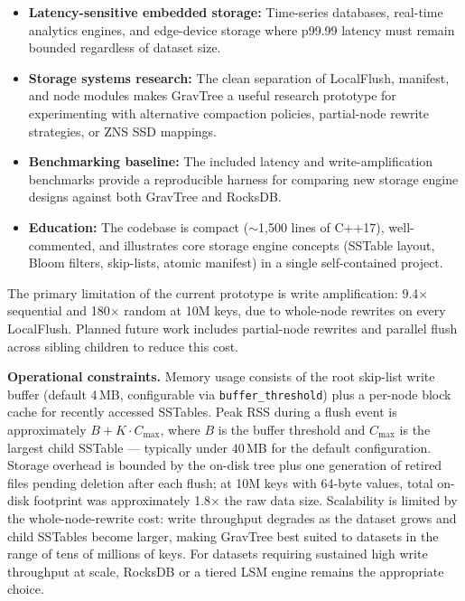 \documentclass{jors}
\begin{document}
\begin{itemize}
  \item \textbf{Latency-sensitive embedded storage:} Time-series
    databases, real-time analytics engines, and edge-device storage where
    p99.99 latency must remain bounded regardless of dataset size.
  \item \textbf{Storage systems research:} The clean separation of
    LocalFlush, manifest, and node modules makes GravTree a useful
    research prototype for experimenting with alternative compaction
    policies, partial-node rewrite strategies, or ZNS SSD mappings.
  \item \textbf{Benchmarking baseline:} The included latency and
    write-amplification benchmarks provide a reproducible harness for
    comparing new storage engine designs against both GravTree and
    RocksDB.
  \item \textbf{Education:} The codebase is compact ($\sim$1,500 lines
    of C++17), well-commented, and illustrates core storage engine
    concepts (SSTable layout, Bloom filters, skip-lists, atomic manifest)
    in a single self-contained project.
\end{itemize}

The primary limitation of the current prototype is write amplification:
9.4$\times$ sequential and 180$\times$ random at 10M keys, due to
whole-node rewrites on every LocalFlush. Planned future work includes
partial-node rewrites and parallel flush across sibling children to
reduce this cost.

\textbf{Operational constraints.} Memory usage consists of the root
skip-list write buffer (default 4\,MB, configurable via
\texttt{buffer\_threshold}) plus a per-node block cache for recently
accessed SSTables.  Peak RSS during a flush event is approximately
$B + K \cdot C_{\max}$, where $B$ is the buffer threshold and $C_{\max}$
is the largest child SSTable — typically under 40\,MB for the default
configuration.  Storage overhead is bounded by the on-disk tree plus one
generation of retired files pending deletion after each flush; at 10M
keys with 64-byte values, total on-disk footprint was approximately
1.8$\times$ the raw data size.  Scalability is limited by the
whole-node-rewrite cost: write throughput degrades as the dataset grows
and child SSTables become larger, making GravTree best suited to datasets
in the range of tens of millions of keys.  For datasets requiring
sustained high write throughput at scale, RocksDB or a tiered LSM engine
remains the appropriate choice.
\end{document}
